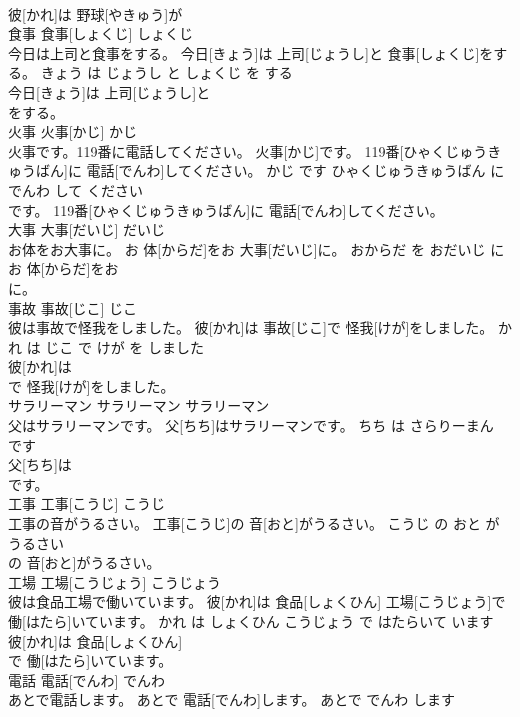 \documentclass[8pt]{extreport}
\begin{document}
\begin{CJK}{UTF8}{min}
\\	彼[かれ]は 野球[やきゅう]が
\\	食事	食事[しょくじ]	しょくじ	
\\	今日は上司と食事をする。	今日[きょう]は 上司[じょうし]と 食事[しょくじ]をする。	きょう は じょうし と しょくじ を する	
\\	今日[きょう]は 上司[じょうし]と
\\	をする。		
\\	火事	火事[かじ]	かじ	
\\	火事です。119番に電話してください。	火事[かじ]です。 119番[ひゃくじゅうきゅうばん]に 電話[でんわ]してください。	かじ です ひゃくじゅうきゅうばん に でんわ して ください	
\\	です。 119番[ひゃくじゅうきゅうばん]に 電話[でんわ]してください。		
\\	大事	大事[だいじ]	だいじ	
\\	お体をお大事に。	お 体[からだ]をお 大事[だいじ]に。	おからだ を おだいじ に	
\\	お 体[からだ]をお
\\	に。		
\\	事故	事故[じこ]	じこ	
\\	彼は事故で怪我をしました。	彼[かれ]は 事故[じこ]で 怪我[けが]をしました。	かれ は じこ で けが を しました	
\\	彼[かれ]は
\\	で 怪我[けが]をしました。		
\\	サラリーマン	サラリーマン	サラリーマン	
\\	父はサラリーマンです。	父[ちち]はサラリーマンです。	ちち は さらりーまん です	
\\	父[ちち]は
\\	です。		
\\	工事	工事[こうじ]	こうじ	
\\	工事の音がうるさい。	工事[こうじ]の 音[おと]がうるさい。	こうじ の おと が うるさい	
\\	の 音[おと]がうるさい。		
\\	工場	工場[こうじょう]	こうじょう	
\\	彼は食品工場で働いています。	彼[かれ]は 食品[しょくひん] 工場[こうじょう]で 働[はたら]いています。	かれ は しょくひん こうじょう で はたらいて います	
\\	彼[かれ]は 食品[しょくひん]
\\	で 働[はたら]いています。		
\\	電話	電話[でんわ]	でんわ	
\\	あとで電話します。	あとで 電話[でんわ]します。	あとで でんわ します	

\end{CJK}
\end{document}
